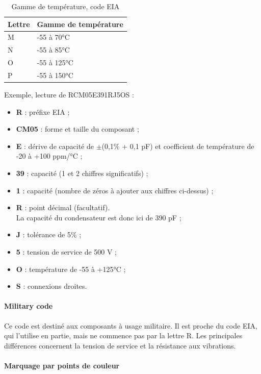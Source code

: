 \documentclass[a4paper]{article}
\begin{document}
\begin{table}[H]
	\centering
		\begin{tabular}{|l|l|}\hline
				Lettre & Gamme de température\\\hline\hline
				M	& -55 à 70°C\\\hline
				N	& -55 à 85°C\\\hline
				O	& -55 à 125°C\\\hline
				P	& -55 à 150°C\\\hline
		\end{tabular}
	\caption{Gamme de température, code \ac{EIA}
		\label{Gamme_de_temperature_code_EIA}}
\end{table}

Exemple, lecture de \og{}RCM05E391RJ5OS\fg{} :

\begin{itemize}
	\item \textbf{R} : préfixe \ac{EIA} ;
	\item \textbf{CM05} : forme et taille du composant ;
	\item \textbf{E} : dérive de capacité de $\pm$(0,1\% + 0,1 pF) et coefficient de température de -20 à +100 ppm/°C ;
	\item \textbf{39} : capacité (1\ier{} et 2\ieme{} chiffres significatifs) ;
	\item \textbf{1} : capacité (nombre de zéros à ajouter aux chiffres ci-dessus) ;
	\item \textbf{R} : point décimal (facultatif).\\
	La capacité du condensateur est donc ici de 390 pF ;
	\item \textbf{J} : tolérance de 5\% ;
	\item \textbf{5} : tension de service de 500 V ;
	\item \textbf{O} : température de -55 à +125°C ;
	\item \textbf{S} : connexions droites.
\end{itemize}

\paragraph{Military code}

Ce code est destiné aux composants à usage militaire. Il est proche du code \ac{EIA}, qui l'utilise en partie, mais ne commence pas par la lettre \og{}R\fg{}. Les principales différences concernent la tension de service et la résistance aux vibrations.

\paragraph{Marquage par points de couleur}
\end{document}
